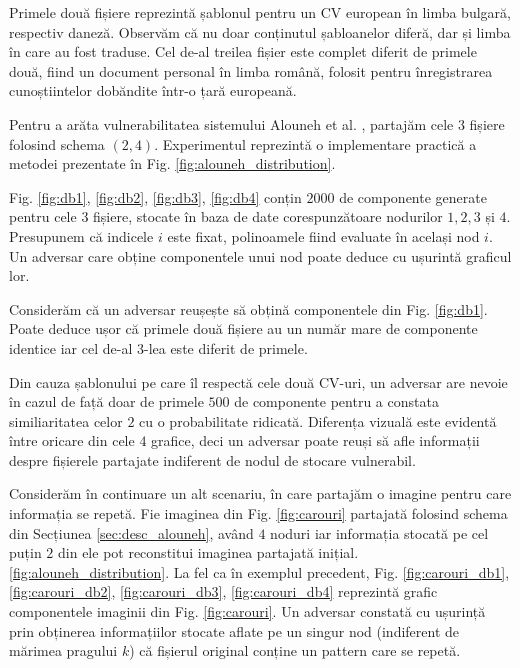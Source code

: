 \documentclass[oneside, 12pt]{book}
\begin{document}
Primele două fișiere reprezintă șablonul pentru un CV european în limba bulgară, respectiv daneză. Observăm că nu doar conținutul șabloanelor diferă, dar și limba în care au fost traduse. Cel de-al treilea fișier este complet diferit de primele două, fiind un document personal în limba română, folosit pentru înregistrarea cunoștiintelor dobăndite într-o țară europeană.

Pentru a arăta vulnerabilitatea sistemului Alouneh et al. {\cite{AAMK:2013}}, partajăm cele $3$ fișiere folosind schema $(2, 4)$. Experimentul reprezintă o implementare practică a metodei prezentate în Fig. {\ref{fig:alouneh_distribution}}.

Fig. {\ref{fig:db1}}, {\ref{fig:db2}}, {\ref{fig:db3}}, {\ref{fig:db4}} conțin $2000$ de componente generate pentru cele $3$ fișiere, stocate în baza de date corespunzătoare nodurilor $1,2,3$ și $4$. Presupunem că indicele $i$ este fixat, polinoamele fiind evaluate în același nod $i$. Un adversar care obține componentele unui nod poate deduce cu ușurintă graficul lor.

Considerăm că un adversar reușește să obțină componentele din Fig. {\ref{fig:db1}}. Poate deduce ușor că primele două fișiere au un număr mare de componente identice iar cel de-al $3$-lea este diferit de primele.

Din cauza șablonului pe care îl respectă cele două CV-uri, un adversar are nevoie în cazul de față doar de primele $500$ de componente pentru a constata similiaritatea celor $2$ cu o probabilitate ridicată.
Diferența vizuală este evidentă între oricare din cele $4$ grafice, deci un adversar poate reuși să afle informații despre fișierele partajate indiferent de nodul de stocare vulnerabil.

Considerăm în continuare un alt scenariu, în care partajăm o imagine pentru care informația se repetă. Fie imaginea din Fig. {\ref{fig:carouri}} partajată folosind schema din Secțiunea {\ref{sec:desc_alouneh}}, având $4$ noduri iar informația stocată pe cel puțin $2$ din ele pot reconstitui imaginea partajată inițial. {\ref{fig:alouneh_distribution}}. La fel ca în exemplul precedent, Fig. {\ref{fig:carouri_db1}, \ref{fig:carouri_db2}, \ref{fig:carouri_db3}, \ref{fig:carouri_db4}} reprezintă grafic componentele imaginii din Fig. {\ref{fig:carouri}}. Un adversar constată cu ușurință prin obținerea informațiilor stocate aflate pe un singur nod (indiferent de mărimea pragului $k$) că fișierul original conține un pattern care se repetă.
\end{document}
